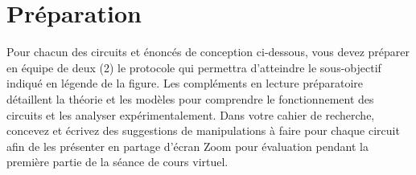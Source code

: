 \documentclass[canadien,12pt,oneside,letterpaper]{article}
\begin{document}
\section{Préparation}

\setlength{\parskip}{1ex plus 0.5ex minus 0.2ex}
Pour chacun des circuits et énoncés de conception ci-dessous, vous devez préparer en équipe de deux (2) le protocole qui permettra d'atteindre le sous-objectif indiqué en légende de la figure. Les compléments en lecture préparatoire détaillent la théorie et les modèles pour comprendre le fonctionnement des circuits et les analyser expérimentalement. Dans votre cahier de recherche, concevez et écrivez des suggestions de manipulations à faire pour chaque circuit afin de les présenter en partage d'écran Zoom pour évaluation pendant la première partie de la séance de cours virtuel.





\end{document}
